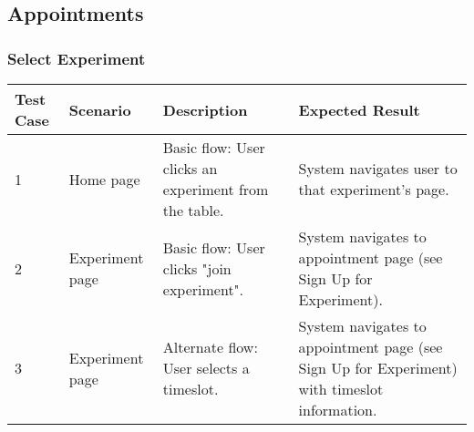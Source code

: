 \subsection{Appointments}
\subsubsection{Select Experiment}
\begin{table}[!h]
    \begin{tabular}{|l|l|l|l|}
        \hline
        Test Case   & Scenario        & Description                             & Expected Result \\ \hline
        1        & Home page               & Basic flow: User clicks an experiment from the table.  & System navigates user to that experiment's page.      \\ \hline
        2        & Experiment page      & Basic flow: User clicks "join experiment".    & System navigates to appointment page (see Sign Up for Experiment).      \\ \hline
        3        & Experiment page      & Alternate flow: User selects a timeslot.    & System navigates to appointment page (see Sign Up for Experiment) with timeslot information.      \\ \hline
    \end{tabular}
\end{table}

